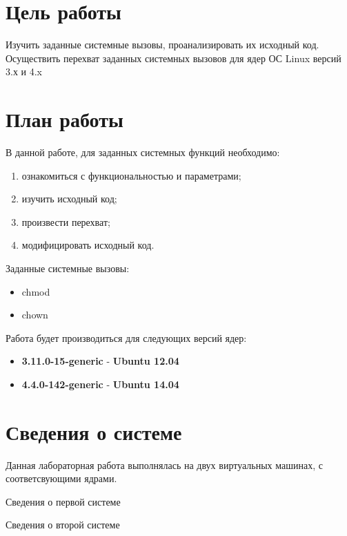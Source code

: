 




\section{Цель работы}
\par Изучить заданные системные вызовы, проанализировать их исходный код. Осуществить перехват заданных системных вызовов для ядер ОС Linux версий 3.х и 4.x

\section{План работы}
В данной работе, для заданных системных функций необходимо:
\begin{enumerate}
    \item ознакомиться с функциональностью и параметрами;
    \item изучить исходный код;
    \item произвести перехват;
    \item модифицировать исходный код.
\end{enumerate}

\par Заданные системные вызовы:
\begin{itemize}
    \item chmod
    \item chown
\end{itemize}

\par Работа будет производиться для следующих версий ядер:
\begin{itemize}
\item \textbf{3.11.0-15-generic} - \textbf{Ubuntu 12.04}
\item \textbf{4.4.0-142-generic} - \textbf{Ubuntu 14.04}
\end{itemize}

\section{Сведения о системе}
\par Данная лабораторная работа выполнялась на двух виртуальных машинах, с соответсвующими ядрами.

\par Сведения о первой системе


\par Сведения о второй системе


